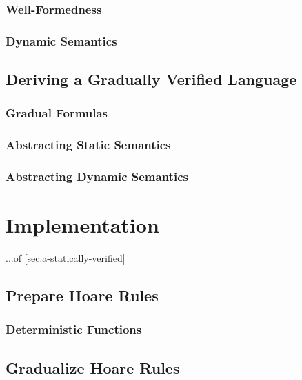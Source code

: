 \subsection{Well-Formedness}
\label{sec:well-formedness}


\subsection{Dynamic Semantics}


\section{Deriving a Gradually Verified Language}

\subsection{Gradual Formulas}

\subsection{Abstracting Static Semantics}

\subsection{Abstracting Dynamic Semantics}


\chapter{Implementation}
...of \ref{sec:a-statically-verified}

\section{Prepare Hoare Rules}

\subsection{Deterministic Functions}

\section{Gradualize Hoare Rules}

